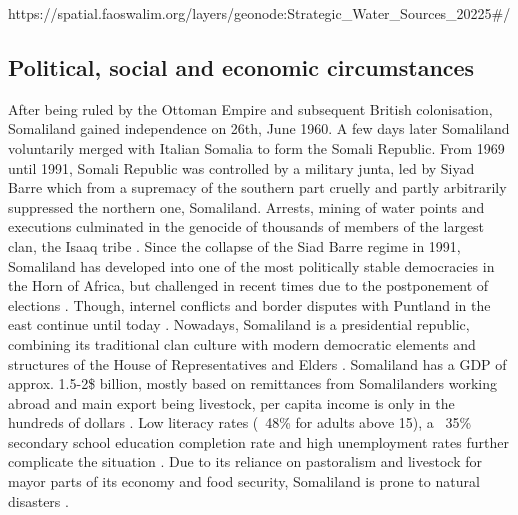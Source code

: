 {%
https://spatial.faoswalim.org/layers/geonode:Strategic_Water_Sources_20225#/





\subsection{Political, social and economic circumstances} %

After being ruled by the Ottoman Empire and subsequent British colonisation, Somaliland gained independence on 26th, June 1960. A few days later Somaliland voluntarily merged with Italian Somalia to form the Somali Republic. From 1969 until 1991, Somali Republic was controlled by a military junta, led by Siyad Barre which from a supremacy of the southern part cruelly and partly arbitrarily suppressed the northern one, Somaliland. Arrests, mining of water points and executions culminated in the genocide of thousands of members of the largest clan, the Isaaq tribe \autocite{peiferStoppingMassKillings2009,republicofsomaliaCountryProfile20212021}. Since the collapse of the Siad Barre regime in 1991, Somaliland has developed into one of the most politically stable democracies in the Horn of Africa, but challenged in recent times due to the postponement of elections \autocite{bbcSomalilandProfile2022, fortiPocketStabilityUnderstanding2011}. Though, internel conflicts and border disputes with Puntland in the east continue until today \autocite{filhoDEMOCRACYAFRICAOUTSTANDING2021}. Nowadays, Somaliland is a presidential republic, combining its traditional clan culture with modern democratic elements and structures of the House of Representatives and Elders \autocite{salemTerritorialDiagnosticReport2016}.
Somaliland has a GDP of approx. 1.5-2\$ billion, mostly based on remittances from Somalilanders working abroad and main export being livestock, per capita income is only in the hundreds of dollars \autocite{klobucistaSomalilandHornAfrica2018, republicofsomaliaCountryProfile20212021, worldbankNewWorldBank2014}. Low literacy rates (~48\% for adults above 15), a ~35\% secondary school education completion rate and high unemployment rates further complicate the situation \autocite{republicofsomaliaCountryProfile20212021,worldbankNewWorldBank2014}. Due to its reliance on pastoralism and livestock for mayor parts of its economy and food security, Somaliland is prone to natural disasters \autocite{usaidcenterforresilienceEconomicsResilienceDrought2018}.


}
